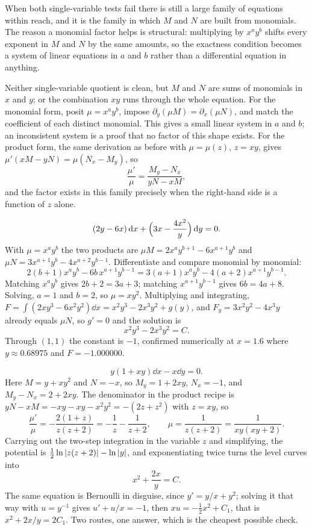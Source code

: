 When both single-variable tests fail there is still a large family of equations within reach, and it is the family in which $M$ and $N$ are built from monomials. The reason a monomial factor helps is structural: multiplying by $x^{a}y^{b}$ shifts every exponent in $M$ and $N$ by the same amounts, so the exactness condition becomes a system of linear equations in $a$ and $b$ rather than a differential equation in anything.

\cue Neither single-variable quotient is clean, but $M$ and $N$ are sums of monomials in $x$ and $y$; or the combination $xy$ runs through the whole equation.
\method For the monomial form, posit $\mu=x^{a}y^{b}$, impose $\partial_y(\mu M)=\partial_x(\mu N)$, and match the coefficient of each distinct monomial. This gives a small linear system in $a$ and $b$; an inconsistent system is a proof that no factor of this shape exists. For the product form, the same derivation as before with $\mu=\mu(z)$, $z=xy$, gives $\mu'(xM-yN)=\mu(N_x-M_y)$, so
\[\frac{\mu'}{\mu}=\frac{M_y-N_x}{yN-xM},\]
and the factor exists in this family precisely when the right-hand side is a function of $z$ alone.

\begin{worked}
\[(2y-6x)\,\mathrm{d} x+\Bigl(3x-\frac{4x^{2}}{y}\Bigr)\,\mathrm{d} y=0.\]
With $\mu=x^{a}y^{b}$ the two products are $\mu M=2x^{a}y^{b+1}-6x^{a+1}y^{b}$ and $\mu N=3x^{a+1}y^{b}-4x^{a+2}y^{b-1}$. Differentiate and compare monomial by monomial:
\[2(b+1)x^{a}y^{b}-6b\,x^{a+1}y^{b-1}=3(a+1)x^{a}y^{b}-4(a+2)x^{a+1}y^{b-1}.\]
Matching $x^{a}y^{b}$ gives $2b+2=3a+3$; matching $x^{a+1}y^{b-1}$ gives $6b=4a+8$. Solving, $a=1$ and $b=2$, so $\mu=xy^{2}$. Multiplying and integrating, $F=\int(2xy^{3}-6x^{2}y^{2})\dd x=x^{2}y^{3}-2x^{3}y^{2}+g(y)$, and $F_y=3x^{2}y^{2}-4x^{3}y$ already equals $\mu N$, so $g'=0$ and the solution is
\[x^{2}y^{3}-2x^{3}y^{2}=C.\]
Through $(1,1)$ the constant is $-1$, confirmed numerically at $x=1.6$ where $y\approx0.68975$ and $F=-1.000000$.
\end{worked}

\begin{worked}
\[y(1+xy)\dd x-x\dd y=0.\]
Here $M=y+xy^{2}$ and $N=-x$, so $M_y=1+2xy$, $N_x=-1$, and $M_y-N_x=2+2xy$. The denominator in the product recipe is $yN-xM=-xy-xy-x^{2}y^{2}=-(2z+z^{2})$ with $z=xy$, so
\[\frac{\mu'}{\mu}=-\frac{2(1+z)}{z(z+2)}=-\frac{1}{z}-\frac{1}{z+2},\qquad \mu=\frac{1}{z(z+2)}=\frac{1}{xy(xy+2)}.\]
Carrying out the two-step integration in the variable $z$ and simplifying, the potential is $\tfrac12\ln\left\lvert z(z+2)\right\rvert-\ln\left\lvert y\right\rvert$, and exponentiating twice turns the level curves into
\[x^{2}+\frac{2x}{y}=C.\]
The same equation is Bernoulli in disguise, since $y'=y/x+y^{2}$; solving it that way with $u=y^{-1}$ gives $u'+u/x=-1$, then $xu=-\tfrac12x^{2}+C_1$, that is $x^{2}+2x/y=2C_1$. Two routes, one answer, which is the cheapest possible check.
\end{worked}


